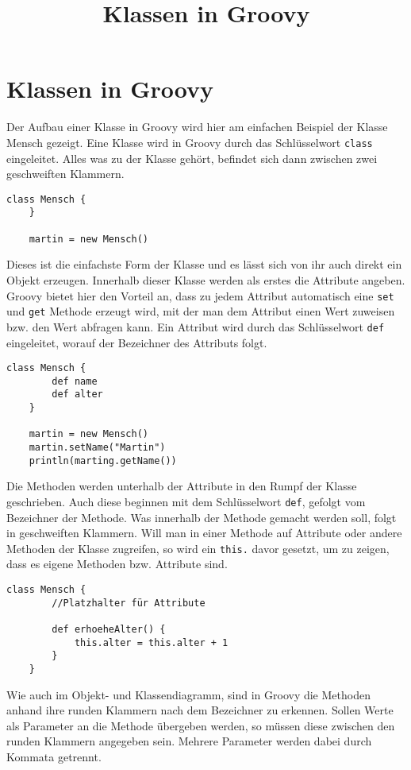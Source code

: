 \documentclass[11pt,a4paper,parskip=half]{scrartcl}
\title{Klassen in Groovy}
\begin{document}
\section*{Klassen in Groovy}

Der Aufbau einer Klasse in Groovy wird hier am einfachen Beispiel der Klasse Mensch gezeigt. Eine Klasse wird in Groovy durch das Schlüsselwort \lstinline|class| eingeleitet. Alles was zu der Klasse gehört, befindet sich dann zwischen zwei geschweiften Klammern.

\begin{lstlisting}[gobble=2]
	class Mensch {
	}

	martin = new Mensch()
\end{lstlisting}

Dieses ist die einfachste Form der Klasse und es lässt sich von ihr auch direkt ein Objekt erzeugen. Innerhalb dieser Klasse werden als erstes die Attribute angeben. Groovy bietet hier den Vorteil an, dass zu jedem Attribut automatisch eine \lstinline|set| und \lstinline|get| Methode erzeugt wird, mit der man dem Attribut einen Wert zuweisen bzw. den Wert abfragen kann. Ein Attribut wird durch das Schlüsselwort \lstinline|def| eingeleitet, worauf der Bezeichner des Attributs folgt.

\begin{lstlisting}[gobble=2]
	class Mensch {
		def name
		def alter
	}

	martin = new Mensch()
	martin.setName("Martin")
	println(marting.getName())
\end{lstlisting}

Die Methoden werden unterhalb der Attribute in den Rumpf der Klasse geschrieben. Auch diese beginnen mit dem Schlüsselwort \lstinline|def|, gefolgt vom Bezeichner der Methode. Was innerhalb der Methode gemacht werden soll, folgt in geschweiften Klammern. Will man in einer Methode auf Attribute oder andere Methoden der Klasse zugreifen, so wird ein \lstinline|this.| davor gesetzt, um zu zeigen, dass es eigene Methoden bzw. Attribute sind.

\begin{lstlisting}[gobble=2]
	class Mensch {
		//Platzhalter für Attribute

		def erhoeheAlter() {
			this.alter = this.alter + 1
		}
	}
\end{lstlisting}

Wie auch im Objekt- und Klassendiagramm, sind in Groovy die Methoden anhand ihre runden Klammern nach dem Bezeichner zu erkennen. Sollen Werte als Parameter an die Methode übergeben werden, so müssen diese zwischen den runden Klammern angegeben sein. Mehrere Parameter werden dabei durch Kommata getrennt.
\end{document}
